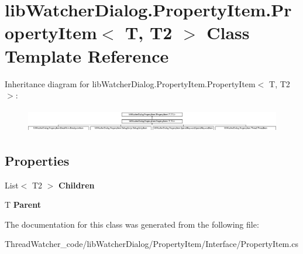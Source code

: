 \hypertarget{classlib_watcher_dialog_1_1_property_item_1_1_property_item_3_01_t_00_01_t2_01_4}{\section{lib\+Watcher\+Dialog.\+Property\+Item.\+Property\+Item$<$ T, T2 $>$ Class Template Reference}
\label{classlib_watcher_dialog_1_1_property_item_1_1_property_item_3_01_t_00_01_t2_01_4}
}
Inheritance diagram for lib\+Watcher\+Dialog.\+Property\+Item.\+Property\+Item$<$ T, T2 $>$\+:\begin{figure}[H]
\begin{center}
\leavevmode
\includegraphics[height=1.037037cm]{classlib_watcher_dialog_1_1_property_item_1_1_property_item_3_01_t_00_01_t2_01_4}
\end{center}
\end{figure}
\subsection*{Properties}
\begin{DoxyCompactItemize}
\item 
\hypertarget{classlib_watcher_dialog_1_1_property_item_1_1_property_item_3_01_t_00_01_t2_01_4_a64372965eb69c8f02ba797c7166734ab}{List$<$ T2 $>$ {\bfseries Children}}\label{classlib_watcher_dialog_1_1_property_item_1_1_property_item_3_01_t_00_01_t2_01_4_a64372965eb69c8f02ba797c7166734ab}

\item 
\hypertarget{classlib_watcher_dialog_1_1_property_item_1_1_property_item_3_01_t_00_01_t2_01_4_a78d536a11f17169d8e3a23c4e767637b}{T {\bfseries Parent}}\label{classlib_watcher_dialog_1_1_property_item_1_1_property_item_3_01_t_00_01_t2_01_4_a78d536a11f17169d8e3a23c4e767637b}

\end{DoxyCompactItemize}


The documentation for this class was generated from the following file\+:\begin{DoxyCompactItemize}
\item 
Thread\+Watcher\+\_\+code/lib\+Watcher\+Dialog/\+Property\+Item/\+Interface/Property\+Item.\+cs\end{DoxyCompactItemize}
